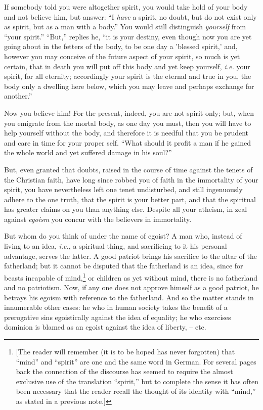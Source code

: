 \documentclass[12pt,a4paper]{book}
\begin{document}
If somebody told you were altogether spirit, you would take hold of your body 
and not believe him, but answer: ``I \textit{have} a spirit, no doubt, but do 
not exist only as spirit, but as a man with a body.'' You would still 
distinguish \textit{yourself} from ``your spirit.'' ``But,'' replies he, 
``it is your destiny, even though now you are yet going about in the fetters 
of the body, to be one day a 'blessed spirit,' and, however you may conceive 
of the future aspect of your spirit, so much is yet certain, that in death you 
will put off this body and yet keep yourself, \textit{i.e.} your spirit, for 
all eternity; accordingly your spirit is the eternal and true in you, the body 
only a dwelling here below, which you may leave and perhaps exchange for 
another.''

Now you believe him! For the present, indeed, you are not spirit only; but, 
when you emigrate from the mortal body, as one day you must, then you will 
have to help yourself without the body, and therefore it is needful that you 
be prudent and care in time for your proper self. ``What should it profit a 
man if he gained the whole world and yet suffered damage in his soul?''

But, even granted that doubts, raised in the course of time against the tenets 
of the Christian faith, have long since robbed you of faith in the immortality 
of your spirit, you have nevertheless left one tenet undisturbed, and still 
ingenuously adhere to the one truth, that the spirit is your better part, and 
that the spiritual has greater claims on you than anything else. Despite all 
your atheism, in zeal against \textit{egoism} you concur with the believers in 
immortality.

But whom do you think of under the name of egoist? A man who, instead of 
living to an idea, \textit{i.e.}, a spiritual thing, and sacrificing to it 
his personal advantage, serves the latter. A good patriot brings his sacrifice 
to the altar of the fatherland; but it cannot be disputed that the fatherland 
is an idea, since for beasts incapable of mind,\footnote{[The reader will 
remember (it is to be hoped has never forgotten) that ``mind'' and 
``spirit'' are one and the same word in German. For several pages back the 
connection of the discourse has seemed to require the almost exclusive use of 
the translation ``spirit,'' but to complete the sense it has often been 
necessary that the reader recall the thought of its identity with ``mind,'' 
as stated in a previous note.]} or children as yet without mind, there is no 
fatherland and no patriotism. Now, if any one does not approve himself as a 
good patriot, he betrays his egoism with reference to the fatherland. And so 
the matter stands in innumerable other cases: he who in human society takes 
the benefit of a prerogative sins egoistically against the idea of equality; 
he who exercises dominion is blamed as an egoist against the idea of liberty, 
-- etc.
\end{document}
